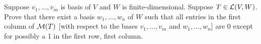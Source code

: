 \begin{solution}
    \\ \td \\
\end{solution}

\begin{exercise}
    Suppose $v_1, ..., v_m$ is basis of $V$ and $W$ is finite-dimensional. Suppose $T \in \mathcal{L}(V,W)$. Prove that there exist a basis $w_1, ..., w_n$ of $W$ such that all entries in the first column of $\operatorname{\mathcal{M}}(T)$ [with respect to the bases $v_1, ..., v_m$ and $w_1, ..., w_n$] are 0 except for possibly a 1 in the first row, first column. \\
\end{exercise}

\begin{solution}
    \\ \td \\
\end{solution}